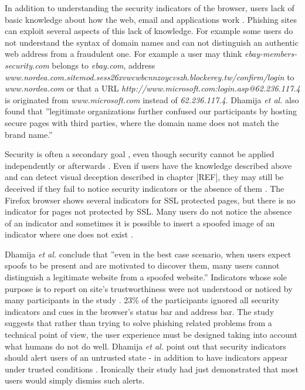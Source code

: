 \documentclass{tktltiki}
\begin{document}
    In addition to understanding the security indicators of the browser, users lack of basic knowledge about how the web, email and applications work \cite{why_phishing_works_06}. Phishing sites can exploit several aspects of this lack of knowledge. For example some users do not understand the syntax of domain names and can not distinguish an authentic web address from a fraudulent one. For example a user may think 
\emph{ebay-members-security.com} belongs to \emph{ebay.com}, address \\
\emph{www.nordea.com.sitemod.sess26xvwcwbcnnzoycvszh.blockerey.tw/confirm/login}
to \emph{www.nordea.com} or that a URL \emph{http://www.microsoft.com:login.asp@62.236.117.4}
is originated from \emph{www.microsoft.com} instead of \emph{62.236.117.4}. 
Dhamija \emph{et al.} \cite{why_phishing_works_06} also found that ''legitimate organizations further confused our participants by hosting secure pages with third parties, where the domain name does not match the brand name.''
        
    Security is often a secondary goal \cite{why_phishing_works_06}, even though security cannot be applied independently or afterwards \cite{schneier_secrets_and_lies_2000, lampson_distributed_1992}. Even if users have the knowledge described above and can detect visual deception described in chapter [REF], they may still be deceived if they fail to notice security indicators or the absence of them \cite{why_phishing_works_06}. The Firefox browser shows several indicators for SSL protected pages, but there is no indicator for pages not protected by SSL. Many users do not notice the absence of an indicator and sometimes it is possible to insert a spoofed image of an indicator where one does not exist \cite{why_phishing_works_06}.
        
    Dhamija \emph{et al.} conclude \cite{why_phishing_works_06} that ''even in the best case scenario, when users expect spoofs to be present and are motivated to discover them, many users cannot distinguish a legitimate website from a spoofed website.'' Indicators whose sole purpose is to report on site's trustworthiness were not understood or noticed by many participants in the study \cite{why_phishing_works_06}. 23\% of the participants ignored all security indicators and cues in the browser's status bar and address bar. The study suggests that rather than trying to solve phishing related problems from a technical point of view, the user experience must be designed taking into account what humans do not do well. Dhamija \emph{et al.} point out that security indicators should alert users of an untrusted state - in addition to have indicators appear under trusted conditions \cite{why_phishing_works_06}. Ironically their study had just demonstrated that most users would simply dismiss such alerts.
        
\end{document}
